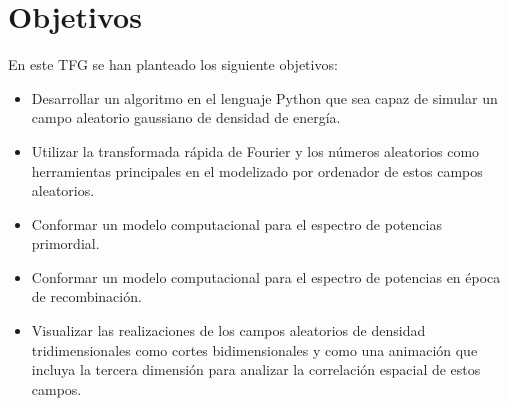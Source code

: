 \chapter{Objetivos}
En este TFG se han planteado los siguiente objetivos:
\begin{itemize}
    \item Desarrollar un algoritmo en el lenguaje Python que sea capaz de simular un campo aleatorio gaussiano de densidad de energía.
    \item Utilizar la transformada rápida de Fourier y los números aleatorios como herramientas principales en el modelizado por ordenador de estos campos aleatorios.
    \item Conformar un modelo computacional para el espectro de potencias primordial.
    \item Conformar un modelo computacional para el espectro de potencias en época de recombinación.
    \item Visualizar las realizaciones de los campos aleatorios de densidad tridimensionales como cortes bidimensionales y como una animación que incluya la tercera dimensión para analizar la correlación espacial de estos campos.
\end{itemize}